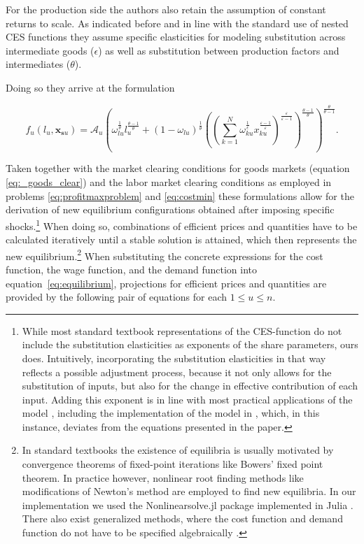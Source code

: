 For the production side the authors also retain the assumption of constant returns to scale. As indicated before and in line with the standard use of nested CES functions they assume specific elasticities for modeling substitution across intermediate goods ($\epsilon$) as well as substitution between production factors and intermediates ($\theta$). 

Doing so they arrive at the formulation

\begin{equation}
    \label{eq:cesprodfun}
    f_u(l_u, \mathbf x_{\mathbf{s} u}) =  \mathcal A_u \left(\omega_{lu}^{\frac{1}{\theta}} l_u^{\frac {\theta-1}{\theta}} + (1- \omega_{lu})^{\frac{1}{\theta}} \left( \left(\sum_{k=1}^N \omega_{ku}^{\frac{1}{\epsilon}} x_{ku}^{\frac{\varepsilon - 1}{\varepsilon}} \right)^{\frac{\varepsilon}{\varepsilon - 1}} \right)^{\frac{\theta-1}{\theta}} \right)^{\frac{\theta}{\theta - 1}}.
\end{equation}

Taken together with the market clearing conditions for goods markets (equation \eqref{eq:_goods_clear}) and the labor market clearing conditions as employed in problems \eqref{eq:profitmaxproblem} and \eqref{eq:costmin} these formulations allow for the derivation of new equilibrium configurations obtained after imposing specific shocks.\footnote{While most standard textbook representations of the CES-function do not include the substitution elasticities as exponents of the share parameters, ours does. Intuitively, incorporating the substitution elasticities in that way reflects a possible adjustment process, because it not only allows for the substitution of inputs, but also for the change in effective contribution of each input. Adding this exponent is in line with most practical applications of the model \citep[e.g.][]{Kim.2017}, including the implementation of the model in \cite{BF2019}, which, in this instance, deviates from the equations presented in the paper.} When doing so, combinations of efficient prices and quantities have to be calculated iteratively until a stable solution is attained, which then represents the new equilibrium.\footnote{In standard textbooks \citep[e.g.][]{cardeneteAppliedGeneralEquilibrium2017} the existence of equilibria is usually motivated by convergence theorems of fixed-point iterations like Bowers' fixed point theorem. In practice however, nonlinear root finding methods like modifications of Newton's method are employed to find new equilibria. In our implementation we used the Nonlinearsolve.jl package \citep[][]{palNonlinearSolvejlHighPerformanceRobust2025} implemented in Julia \citep{bezansonJuliaFreshApproach2017}. There also exist generalized methods, where the cost function and demand function do not have to be specified algebraically \citep[e.g.][]{choiComplementarityApproachSolving2014}.} When substituting the concrete expressions for the cost function, the wage function, and the demand function into equation~\eqref{eq:equilibrium}, projections for efficient prices and quantities are provided by the following pair of equations for each $1 \leq u \leq n$.

